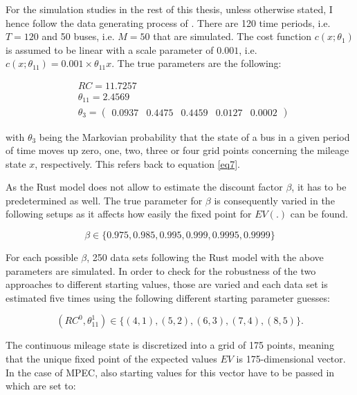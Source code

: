 For the simulation studies in the rest of this thesis, unless otherwise stated, I hence follow the data generating process of \citeauthor{Iskhakov.2016}. There are 120 time periods, i.e. $T=120$ and 50 buses, i.e. $M=50$ that are simulated. The cost function $c(x; \theta_1)$ is assumed to be linear with a scale parameter of $0.001$, i.e. $c(x; \theta_{11}) = 0.001 \times \theta_{11} x$. The true parameters are the following: 

\begin{equation*}
	\begin{split}
		& RC = 11.7257 \\
		& \theta_{11} = 2.4569 \\
		& \theta_3 = \begin{pmatrix}
		0.0937 & 0.4475 & 0.4459 & 0.0127 & 0.0002
		\end{pmatrix}
	\end{split}
\end{equation*} 

with $\theta_3$ being the Markovian probability that the state of a bus in a given period of time moves up zero, one, two, three or four grid points concerning the mileage state $x$, respectively. This refers back to equation \ref{eq7}. 

As the Rust model does not allow to estimate the discount factor $\beta$, it has to be predetermined as well. The true parameter for $\beta$ is consequently varied in the following setups as it affects how easily the fixed point for $EV(.)$ can be found. 

\begin{equation*}
	\beta \in \{0.975, 0.985, 0.995, 0.999, 0.9995, 0.9999\}
\end{equation*}

For each possible $\beta$, 250 data sets following the Rust model with the above parameters are simulated. In order to check for the robustness of the two approaches to different starting values, those are varied and each data set is estimated five times using the following different starting parameter guesses:

\begin{equation*}
	(RC^0, \theta^1_{11}) \in \{(4,1), (5, 2), (6, 3), (7, 4), (8, 5)\}.
\end{equation*}

The continuous mileage state is discretized into a grid of 175 points, meaning that the unique fixed point of the expected values $EV$ is 175-dimensional vector. In the case of MPEC, also starting values for this vector have to be passed in which are set to: 

